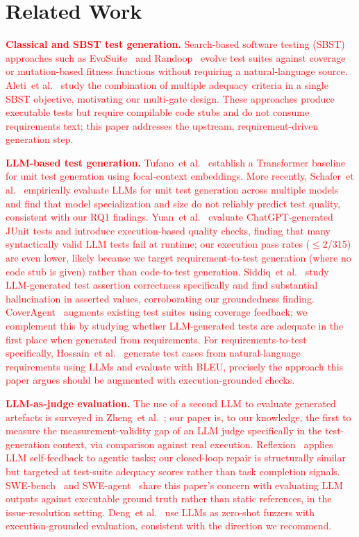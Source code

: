 \documentclass[conference]{IEEEtran}
\newcommand{\etal}{et al.}
\begin{document}
  \section{Related Work}
  \textcolor{red}{
  \textbf{Classical and SBST test generation.}
  Search-based software testing (SBST) approaches such as EvoSuite~\cite{fraser2011evosuite}
  and Randoop~\cite{pacheco2007randoop} evolve test suites against coverage or
  mutation-based fitness functions without requiring a natural-language source.
  Aleti~\etal~\cite{aleti2017multi} study the combination of multiple adequacy
  criteria in a single SBST objective, motivating our multi-gate design. These
  approaches produce executable tests but require compilable code stubs and do
  not consume requirements text; this paper addresses the upstream,
  requirement-driven generation step.

  \textbf{LLM-based test generation.}
  Tufano~\etal~\cite{tufano2022unit} establish a Transformer baseline for unit
  test generation using focal-context embeddings. More recently,
  Schafer~\etal~\cite{schafer2023empirical} empirically evaluate LLMs for unit
  test generation across multiple models and find that model specialization and
  size do not reliably predict test quality, consistent with our RQ1 findings.
  Yuan~\etal~\cite{yuan2023chatgpt} evaluate ChatGPT-generated JUnit tests and
  introduce execution-based quality checks, finding that many syntactically
  valid LLM tests fail at runtime; our execution pass rates ($\leq$2/315)
  are even lower, likely because we target requirement-to-test generation
  (where no code stub is given) rather than code-to-test generation.
  Siddiq~\etal~\cite{siddiq2023empirical} study LLM-generated test assertion
  correctness specifically and find substantial hallucination in asserted
  values, corroborating our groundedness finding.
  CoverAgent~\cite{lemieux2023coveragent} augments existing test suites
  using coverage feedback; we complement this by studying whether LLM-generated
  tests are adequate in the first place when generated from requirements.
  For requirements-to-test specifically, Hossain~\etal~\cite{hossain2024llmreq}
  generate test cases from natural-language requirements using LLMs and evaluate
  with BLEU, precisely the approach this paper argues should be augmented with
  execution-grounded checks.

  \textbf{LLM-as-judge evaluation.}
  The use of a second LLM to evaluate generated artefacts is surveyed in
  Zheng~\etal~\cite{zheng2023judging}; our paper is, to our knowledge, the
  first to measure the measurement-validity gap of an LLM judge specifically
  in the test-generation context, via comparison against real execution.
  Reflexion~\cite{shinn2023reflexion} applies LLM self-feedback to agentic
  tasks; our closed-loop repair is structurally similar but targeted at
  test-suite adequacy scores rather than task completion signals.
  SWE-bench~\cite{jimenez2024swebench} and SWE-agent~\cite{wang2024sweagent}
  share this paper's concern with evaluating LLM outputs against executable
  ground truth rather than static references, in the issue-resolution setting.
  Deng~\etal~\cite{deng2024llmfuzzer} use LLMs as zero-shot fuzzers with
  execution-grounded evaluation, consistent with the direction we recommend.

}
\end{document}
